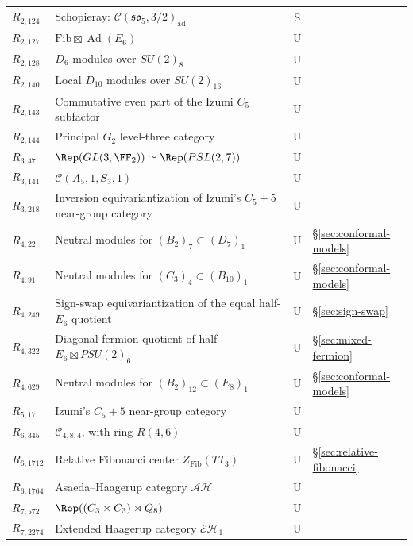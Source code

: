 \begin{longtable}{@{}lp{8.0cm}cl@{}}
$R_{2,124}$ & Schopieray: $\mathcal C(\mathfrak{so}_5,3/2)_{\mathrm{ad}}$ & S & \cite{SchNonPU}\\
$R_{2,127}$ & $\mathrm{Fib}\boxtimes\operatorname{Ad}(E_6)$ & U & \cite{KO}\\
$R_{2,128}$ & $D_6$ modules over $SU(2)_8$ & U & \cite{KO}\\
$R_{2,140}$ & Local $D_{10}$ modules over $SU(2)_{16}$ & U & \cite{KO}\\
$R_{2,143}$ & Commutative even part of the Izumi $C_5$ subfactor & U & \cite{EG}\\
$R_{2,144}$ & Principal $G_2$ level-three category & U & \cite{QGsurvey}\\
\addlinespace
$R_{3,47}$ & $\Rep(GL(3,\FF_2))\simeq\Rep(PSL(2,7))$ & U & \cite{Integral}\\
$R_{3,141}$ & $\mathcal C(A_5,1,S_3,1)$ & U & \cite{Integral}\\
$R_{3,218}$ & Inversion equivariantization of Izumi's $C_5+5$ near-group category & U & \cite{Izumi}\\
\addlinespace
$R_{4,22}$ & Neutral modules for $(B_2)_7\subset(D_7)_1$ & U & \S\ref{sec:conformal-models}\\
$R_{4,91}$ & Neutral modules for $(C_3)_4\subset(B_{10})_1$ & U & \S\ref{sec:conformal-models}\\
$R_{4,249}$ & Sign-swap equivariantization of the equal half-$E_6$ quotient & U & \S\ref{sec:sign-swap}\\
$R_{4,322}$ & Diagonal-fermion quotient of half-$E_6\boxtimes PSU(2)_6$ & U & \S\ref{sec:mixed-fermion}\\
$R_{4,629}$ & Neutral modules for $(B_2)_{12}\subset(E_8)_1$ & U & \S\ref{sec:conformal-models}\\
\addlinespace
$R_{5,17}$ & Izumi's $C_5+5$ near-group category & U & \cite{Izumi}\\
\addlinespace
$R_{6,345}$ & $\mathcal C_{4,8,4}$, with ring $R(4,6)$ & U & \cite{MY}\\
$R_{6,1712}$ & Relative Fibonacci center $Z_{\mathrm{Fib}}(TT_3)$ & U & \S\ref{sec:relative-fibonacci}\\
$R_{6,1764}$ & Asaeda--Haagerup category $\mathcal{AH}_1$ & U & \cite{GSAH}\\
\addlinespace
$R_{7,572}$ & $\Rep((C_3\times C_3)\rtimes Q_8)$ & U & \cite{EGNO}\\
$R_{7,2274}$ & Extended Haagerup category $\mathcal{EH}_1$ & U & \cite{BMPS,GMPPS,BPEH}\\
\end{longtable}
\endgroup
